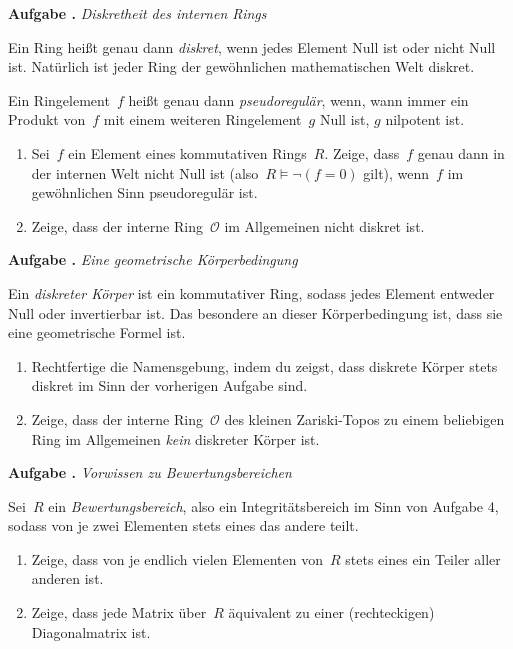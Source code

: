 \documentclass[a4paper,ngerman,12pt]{scrartcl}
\theoremstyle{definition}
\theoremstyle{plain}
\theoremstyle{remark}
\renewcommand{\O}{\mathcal{O}}
\renewcommand{\_}{\mathpunct{.}\,}
\newcommand{\?}{\,{:}\,}
\newlength{\aufgabenskip}
\newcounter{aufgabennummer}
\newenvironment{aufgabe}[1]{
  \addtocounter{aufgabennummer}{1}
  \textbf{Aufgabe \theaufgabennummer{}.} \emph{#1} \par
}{\vspace{\aufgabenskip}}
\begin{document}
\begin{aufgabe}{Diskretheit des internen Rings}
Ein Ring heißt genau dann \emph{diskret}, wenn jedes Element Null ist oder
nicht Null ist. Natürlich ist jeder Ring der gewöhnlichen mathematischen Welt
diskret.

Ein Ringelement~$f$ heißt genau dann \emph{pseudoregulär}, wenn,
wann immer ein Produkt von~$f$ mit einem weiteren Ringelement~$g$ Null ist, $g$
nilpotent ist.
\begin{enumerate}
\item Sei~$f$ ein Element eines kommutativen Rings~$R$. Zeige, dass~$f$ genau
dann in der internen Welt nicht Null ist (also~$R \models \neg(f = 0)$ gilt),
wenn~$f$ im gewöhnlichen Sinn pseudoregulär ist.
\item Zeige, dass der interne Ring~$\O$ im Allgemeinen nicht diskret ist.
\end{enumerate}
\end{aufgabe}

\begin{aufgabe}{Eine geometrische Körperbedingung}
Ein \emph{diskreter Körper} ist ein kommutativer Ring, sodass jedes Element
entweder Null oder invertierbar ist. Das besondere an dieser Körperbedingung
ist, dass sie eine geometrische Formel ist.
\begin{enumerate}
\item Rechtfertige die Namensgebung, indem du zeigst, dass diskrete Körper
stets diskret im Sinn der vorherigen Aufgabe sind.
\item Zeige, dass der
interne Ring~$\O$ des kleinen Zariski-Topos zu einem beliebigen Ring im
Allgemeinen \emph{kein} diskreter Körper ist.
\end{enumerate}
\end{aufgabe}

\begin{aufgabe}{Vorwissen zu Bewertungsbereichen}
Sei~$R$ ein \emph{Bewertungsbereich}, also ein
Integritätsbereich im Sinn von Aufgabe 4, sodass von je zwei Elementen
stets eines das andere teilt.
\begin{enumerate}
\item Zeige, dass von je endlich vielen Elementen von~$R$ stets
eines ein Teiler aller anderen ist.
\item Zeige, dass jede Matrix über~$R$ äquivalent zu einer
(rechteckigen) Diagonalmatrix ist.
\end{enumerate}
\end{aufgabe}
\end{document}
